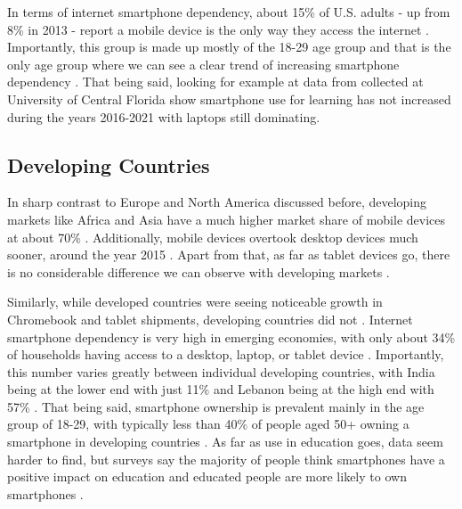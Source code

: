 In terms of internet smartphone dependency, about 15\% of U.S. adults - up from 8\% in 2013 - report a mobile device is the only way they access the internet \parencite{Pew_Research_2021}.
Importantly, this group is made up mostly of the 18-29 age group and that is the only age group where we can see a clear trend of increasing smartphone dependency \parencite{Pew_Research_2021}.
That being said, looking for example at data from \textcite{Educause_2022} collected at University of Central Florida show smartphone use for learning has not increased during the years 2016-2021 with laptops still dominating.

\subsection{Developing Countries}

In sharp contrast to Europe and North America discussed before, developing markets like Africa and Asia have a much higher market share of mobile devices at about 70\% \parencites{StatCounter_Africa_2023}{StatCounter_Asia_2023}.
Additionally, mobile devices overtook desktop devices much sooner, around the year 2015 \parencites{StatCounter_Africa_2023}{StatCounter_Asia_2023}.
Apart from that, as far as tablet devices go, there is no considerable difference we can observe with developing markets \parencites{StatCounter_Africa_2023}{StatCounter_Asia_2023}.

Similarly, while developed countries were seeing noticeable growth in Chromebook and tablet shipments, developing countries did not \parencite{Boreham_2019}.
Internet smartphone dependency is very high in emerging economies, with only about 34\% of households having access to a desktop, laptop, or tablet device \parencite{Pew_Research_2019}.
Importantly, this number varies greatly between individual developing countries, with India being at the lower end with just 11\% and Lebanon being at the high end with 57\% \parencite{Pew_Research_2019}.
That being said, smartphone ownership is prevalent mainly in the age group of 18-29, with typically less than 40\% of people aged 50+ owning a smartphone in developing countries \parencite{Pew_Research_2019}.
As far as use in education goes, data seem harder to find, but surveys say the majority of people think smartphones have a positive impact on education and educated people are more likely to own smartphones \parencite{Pew_Research_2019}.
